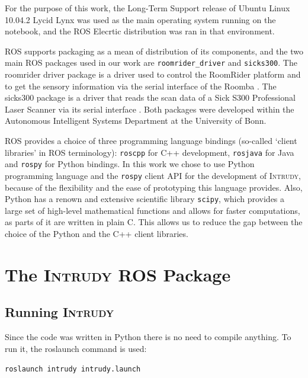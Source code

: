 \documentclass[12pt,a4paper]{scrartcl}
\newcommand{\intrudy}{\textsc{Intrudy}\xspace}
\newcommand{\rospy}{\texttt{rospy}\xspace}
\begin{document}
		For the purpose of this work, the Long-Term Support release of Ubuntu Linux 10.04.2 Lycid Lynx was used as the main operating system running on the notebook, and the ROS Elecrtic distribution was ran in that environment.

		ROS supports packaging as a mean of distribution of its components, and the two main ROS packages used in our work are \texttt{roomrider\_driver} and \texttt{sicks300}. 
		The roomrider driver package is a driver used to control the RoomRider platform and to get the sensory information via the serial interface of the Roomba \cite{ROSRoomrider}. The sicks300 package is a driver that reads the scan data of a Sick S300 Professional Laser Scanner via its serial interface \cite{ROSSicks}.
		Both packages were developed within the Autonomous Intelligent Systems Department at the University of Bonn.

		ROS provides a choice of three programming language bindings (so-called `client libraries' in ROS terminology): \texttt{roscpp} for C++ development, \texttt{rosjava} for Java and \rospy for Python bindings. In this work we chose to use Python programming language and the \rospy client API for the development of \intrudy, because of the flexibility and the ease of prototyping this language provides. Also, Python has a renown and extensive scientific library \texttt{scipy}, which provides a large set of high-level mathematical functions and allows for faster computations, as parts of it are written in plain C. This allows us to reduce the gap between the choice of the Python and the C++ client libraries.



\newpage

\section{The \intrudy ROS Package} %
\label{sec:intrudy_ros_package}

	\subsection{Running \intrudy} %
	\label{sub:running_intrudy}
	Since the code was written in Python there is no need to compile anything. To run it, the roslaunch command is used:


	\texttt{roslaunch intrudy intrudy.launch}
\end{document}
